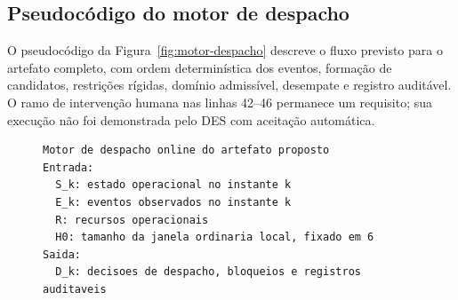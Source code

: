 \documentclass[
  12pt,
  oneside,
  a4paper,
  sumario=tradicional,
  brazil
]{abntex2}
\begin{document}
\subsection{Pseudocódigo do motor de despacho}
O pseudoc\'odigo da Figura~\ref{fig:motor-despacho} descreve o fluxo previsto para o artefato completo, com ordem determin\'istica dos eventos, forma\c{c}\~ao de candidatos, restri\c{c}\~oes r\'igidas, dom\'inio admiss\'ivel, desempate e registro audit\'avel. O ramo de interven\c{c}\~ao humana nas linhas 42--46 permanece um requisito; sua execu\c{c}\~ao n\~ao foi demonstrada pelo DES com aceita\c{c}\~ao autom\'atica.

\begin{figure}[H]
\centering
{\scriptsize
\noindent{\color{pequiDark}\rule{0.94\textwidth}{0.8pt}}\par\vspace{2pt}
\begin{minipage}{0.94\textwidth}
\begin{verbatim}
Motor de despacho online do artefato proposto
Entrada:
  S_k: estado operacional no instante k
  E_k: eventos observados no instante k
  R: recursos operacionais
  H0: tamanho da janela ordinaria local, fixado em 6
Saida:
  D_k: decisoes de despacho, bloqueios e registros auditaveis


\end{verbatim}
\end{minipage}}
\end{figure}
\end{document}
